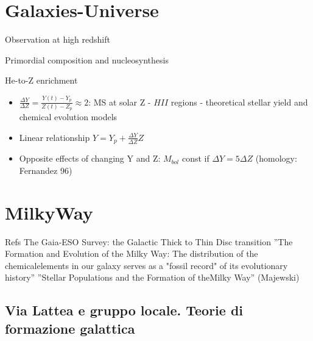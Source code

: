 \section{Galaxies-Universe}

\begin{frame}{Observation at high redshift}

\end{frame}

\begin{frame}{Primordial composition and nucleosynthesis}

\end{frame}

\begin{frame}{He-to-Z enrichment}
\begin{itemize}
\item $\frac{\Delta Y}{\Delta Z}=\frac{Y(t)-Y_p}{Z(t)-Z_p}\approx2$: MS at solar Z - $HII$ regions - theoretical stellar yield and chemical evolution models
\item Linear relationship $Y=Y_p+\frac{\Delta Y}{\Delta Z}Z$
\item Opposite effects of changing Y and Z: $M_{bol}$ const if $\Delta Y=5\Delta Z$ (homology: Fernandez 96)
\end{itemize}
\end{frame}

\section{MilkyWay}

\begin{frame}{Refs}
The Gaia-ESO Survey: the Galactic Thick to Thin Disc transition
''The Formation and Evolution of the Milky Way: The distribution of the chemicalelements in our galaxy serves as a "fossil record" of its evolutionary history''
''Stellar Populations and the Formation of theMilky Way'' (Majewski)
\end{frame}

\subsection{Via Lattea e gruppo locale. Teorie di formazione galattica}

